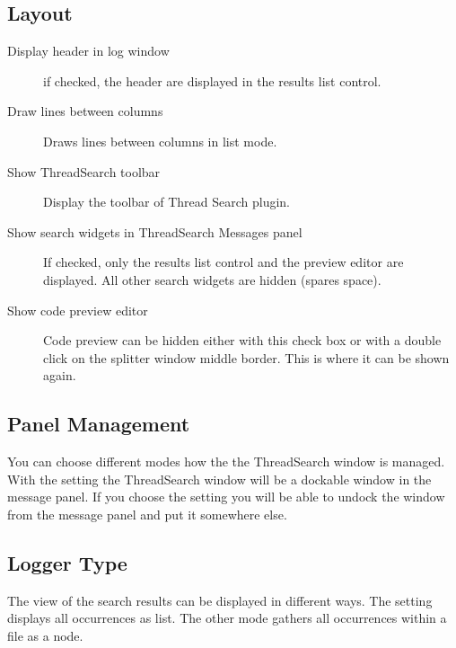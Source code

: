 \subsection{Layout}

\begin{description}
\item[Display header in log window] if checked, the header are displayed in the results list control.
\item[Draw lines between columns] Draws lines between columns in list mode.
\item[Show ThreadSearch toolbar] Display the toolbar of Thread Search plugin.
\item[Show search widgets in ThreadSearch Messages panel] If checked, only the results list control and the preview editor are displayed. All other search widgets are hidden (spares space).
\item[Show code preview editor] Code preview can be hidden either with this check box or with a double click on the splitter window middle border. This is where it can be shown again. 
\end{description}

\subsection{Panel Management}

You can choose different modes how the the ThreadSearch window is managed. With the setting  the ThreadSearch window will be a dockable window in the message panel. If you choose the setting  you will be able to undock the window from the message panel and put it somewhere else.

\subsection{Logger Type}

The view of the search results can be displayed in different ways. The setting  displays all occurrences as list. The other mode  gathers all occurrences within a file as a node. 
